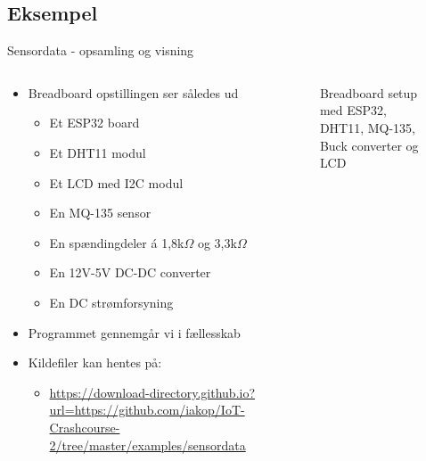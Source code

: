 \documentclass[aspectratio=169]{beamer}
\begin{document}
\subsection{Eksempel}
\begin{frame}{Sensordata - opsamling og visning}
\begin{columns}
	\begin{column}{0.5\textwidth}
		\begin{textBox}
		\begin{itemize}
			\item Breadboard opstillingen ser således ud
			\begin{itemize}
				\item Et ESP32 board
				\item Et DHT11 modul
				\item Et LCD med I2C modul
				\item En MQ-135 sensor
				\item En spændingdeler á 1,8{\textsf{k$\Omega$}} og 3,3{\textsf{k$\Omega$}}
				\item En 12V-5V DC-DC converter
				\item En DC strømforsyning
			\end{itemize}
			\item Programmet gennemgår vi i fællesskab
			\item Kildefiler kan hentes på:
			\begin{itemize}
				\item \tiny\url{https://download-directory.github.io?url=https://github.com/iakop/IoT-Crashcourse-2/tree/master/examples/sensordata}
			\end{itemize}
		\end{itemize}
		\end{textBox}
	\end{column}
	\begin{column}{0.5\textwidth}
		\centering
		\begin{figure}
  			
  			\caption{Breadboard setup med ESP32, DHT11, MQ-135, Buck converter og LCD}
  			\label{fig:sensordata}
		\end{figure}
	\end{column}
\end{columns}
\end{frame}
\end{document}
